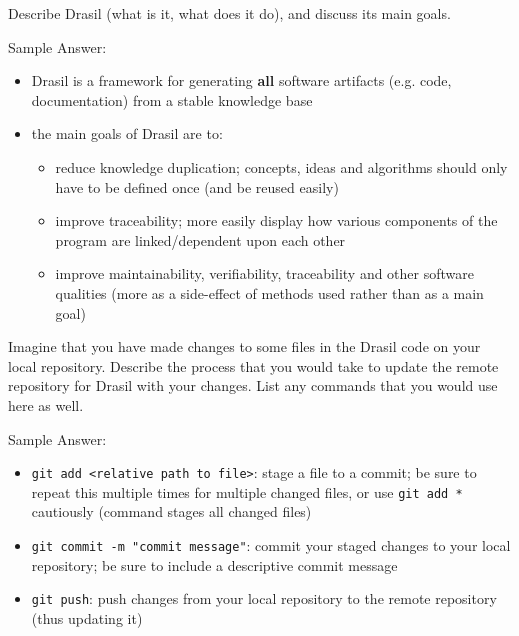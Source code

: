 \documentclass[12pt,fleqn]{examtst}
\begin{document}

\newpage
\noindent
\begin{minipage}{\textwidth}

Describe Drasil (what is it, what does it do), and discuss its main goals.


Sample Answer:
\begin{itemize}
    \item Drasil is a framework for generating \textbf{all} software artifacts (e.g. code, documentation) from a stable knowledge base
    \item the main goals of Drasil are to:
    \begin{itemize}
        \item reduce knowledge duplication; concepts, ideas and algorithms should only have to be defined once (and be reused easily)
        \item improve traceability; more easily display how various components of the program are linked/dependent upon each other
        \item improve maintainability, verifiability, traceability and other software qualities (more as a side-effect of methods used rather than as a main goal)
    \end{itemize}
\end{itemize}

\rule{0cm}{1cm}

Imagine that you have made changes to some files in the Drasil code on your local repository. Describe the process that you would take to update the remote repository for Drasil with your changes. List any commands that you would use here as well.


Sample Answer:
\begin{itemize}
    \item \lstinline{git add <relative path to file>}: stage a file to a commit; be sure to repeat this multiple times for multiple changed files, or use \lstinline{git add *} cautiously (command stages all changed files)
    \item \lstinline{git commit -m "commit message"}: commit your staged changes to your local repository; be sure to include a descriptive commit message
    \item \lstinline{git push}: push changes from your local repository to the remote repository (thus updating it)
\end{itemize}

\rule{0cm}{1cm}

\end{minipage}
\end{document}
